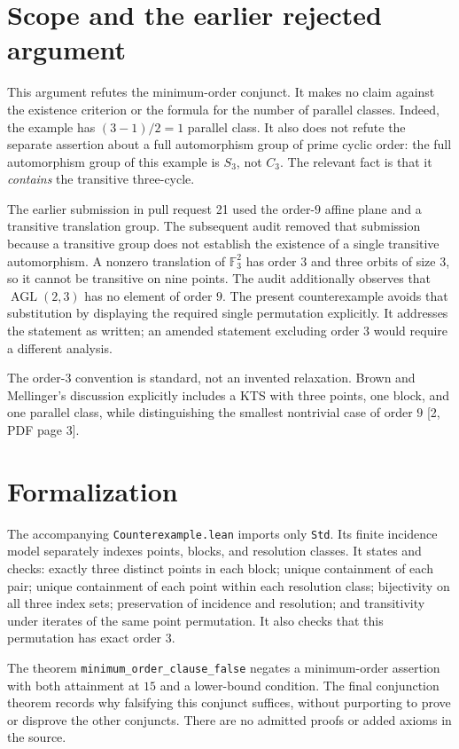 \documentclass[11pt]{article}
\begin{document}
\section{Scope and the earlier rejected argument}
This argument refutes the minimum-order conjunct. It makes no claim
against the existence criterion or the formula for the number of
parallel classes. Indeed, the example has $(3-1)/2=1$ parallel class.
It also does not refute the separate assertion about a full
automorphism group of prime cyclic order: the full automorphism group
of this example is $S_3$, not $C_3$. The relevant fact is that it
\emph{contains} the transitive three-cycle.

The earlier submission in pull request 21 used the order-$9$ affine
plane and a transitive translation group. The subsequent audit removed
that submission because a transitive group does not establish the
existence of a single transitive automorphism. A nonzero translation of
$\mathbb F_3^2$ has order $3$ and three orbits of size $3$, so it cannot
be transitive on nine points. The audit additionally observes that
$\operatorname{AGL}(2,3)$ has no element of order $9$. The present
counterexample avoids that substitution by displaying the required
single permutation explicitly. It addresses the statement as written;
an amended statement excluding order $3$ would require a different
analysis.

The order-$3$ convention is standard, not an invented relaxation.
Brown and Mellinger's discussion explicitly includes a KTS with three
points, one block, and one parallel class, while distinguishing the
smallest nontrivial case of order $9$ [2, PDF page 3].

\section{Formalization}
The accompanying \texttt{Counterexample.lean} imports only \texttt{Std}.
Its finite incidence model separately indexes points, blocks, and
resolution classes. It states and checks: exactly three distinct points
in each block; unique containment of each pair; unique containment of
each point within each resolution class; bijectivity on all three index
sets; preservation of incidence and resolution; and transitivity under
iterates of the same point permutation. It also checks that this
permutation has exact order $3$.

The theorem \texttt{minimum\_order\_clause\_false} negates a
minimum-order assertion with both attainment at $15$ and a lower-bound
condition. The final conjunction theorem records why falsifying this
conjunct suffices, without purporting to prove or disprove the other
conjuncts. There are no admitted proofs or added axioms in the source.
\end{document}
